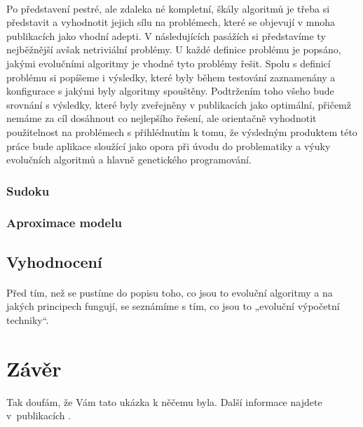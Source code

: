 \documentclass[bc,male,java,dept460]{diploma}		%
\begin{document}
\paragraph*{}
Po představení pestré, ale zdaleka né kompletní, škály algoritmů je třeba si představit a vyhodnotit jejich sílu na problémech, které se objevují v mnoha publikacích jako vhodní adepti. V následujících pasážích si představíme ty nejběžnější avšak netriviální problémy. U každé definice problému je popsáno, jakými evolučními algoritmy je vhodné tyto problémy řešit. Spolu s definicí problému si popíšeme i výsledky, které byly během testování zaznamenány a konfigurace s jakými byly algoritmy spouštěny. Podtržením toho všeho bude srovnání s výsledky, které byly zveřejněny v publikacích jako optimální, přičemž nemáme za cíl dosáhnout co nejlepšího řešení, ale orientačně vyhodnotit použitelnost na problémech s přihlédnutím k tomu, že výsledným produktem této práce bude aplikace sloužící jako opora při úvodu do problematiky a výuky evolučních algoritmů a hlavně genetického programování.

\subsubsection{Sudoku}
\paragraph*{}


\subsubsection{Aproximace modelu}
\paragraph*{}


\subsection{Vyhodnocení}
\paragraph*{}
Před tím, než se pustíme do popisu toho, co jsou to evoluční algoritmy a na jakých principech fungují, se seznámíme s tím, co jsou to „evoluční výpočetní techniky“.

\section{Závěr}
\label{sec:Conclusion}
Tak doufám, že Vám tato ukázka k něčemu byla. Další informace najdete v~publikacích
\cite{goossens94,lamport94}.
\end{document}
